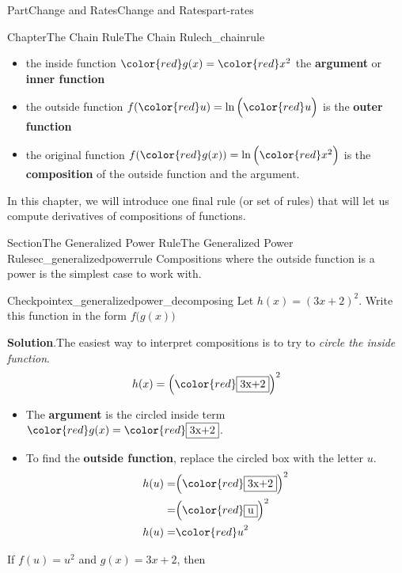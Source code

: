 \documentclass{tufte-book}
\newcommand{\blocktitlefont}{\relax}
\newcommand{\terminology}[1]{\textbf{#1}}
\numberwithin{equation}{chapter}
\newcommand{\red}[1]{   {\color{red}   #1}   }
\newcommand{\amp}{&}
\begin{document}
\begin{partptx}{Part}{Change and Rates}{}{Change and Rates}{}{}{part-rates}
\begin{chapterptx}{Chapter}{The Chain Rule}{}{The Chain Rule}{}{}{ch_chainrule}
\begin{introduction}{}
\begin{itemize}[label=\textbullet]
\item{}the inside function \(\red{g(x)} = \red{x^2}\) the \terminology{argument} or \terminology{inner function}%
\item{}the outside function \(f(\red{u}) = \ln\Big(\red{u}\Big)\) is the \terminology{outer function}%
\item{}the original function \(f(\red{g(x)}) = \ln\Big( \red{x^2} \Big)\) is the \terminology{composition} of the outside function and the argument.%
\end{itemize}
%
\par
In this chapter, we will introduce one final rule (or set of rules) that will let us compute derivatives of compositions of functions.%
\end{introduction}%
%
%
\typeout{************************************************}
\typeout{************************************************}
%
\begin{sectionptx}{Section}{The Generalized Power Rule}{}{The Generalized Power Rule}{}{}{sec_generalizedpowerrule}
Compositions where the outside function is a power is the simplest case to work with.%
\begin{inlineexercise}{Checkpoint}{}{ex_generalizedpower_decomposing}%
Let \(h(x) = (3x+2)^2\). Write this function in the form \(f\Big(g(x)\Big)\)%
\par\smallskip%
\noindent\textbf{\blocktitlefont Solution}.\hypertarget{ex_generalizedpower_decomposing-2}{}\quad{}The easiest way to interpret compositions is to try to \emph{circle the inside function}.%
\begin{equation*}
h(x) = \Big( \red{\framebox{3x+2}} \Big)^2
\end{equation*}
%
\begin{itemize}[label=\textbullet]
\item{}The \terminology{argument} is the circled inside term \(\red{g(x)} = \color{red} \framebox{3x+2}\).%
\item{}To find the \terminology{outside function}, replace the circled box with the letter \(u\).%
\begin{align*}
h(u) = \amp \Big( \red{\framebox{3x+2}} \Big)^2  \\
= \amp \Big( \red{\framebox{u}} \Big)^2  \\
h(u) = \amp \red{u}^2
\end{align*}
%
\end{itemize}
If \(f(u) = u^2\) and \(g(x) = 3x+2\), then%

\end{inlineexercise}
\end{sectionptx}
\end{chapterptx}
\end{partptx}
\end{document}
